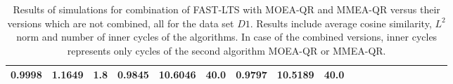 \documentclass[thesis=B,english]{FITthesis}[2012/10/20]
\begin{document}
\begin{table}[h!]
\begin{adjustbox}{angle=90}
{\begin{tabular}{l|l|l|l|r|r|r|r|r|r|r|r|r|r|r|r|r|r|r|}
       0.9998 &  1.1649 &   1.8 &  0.9845 &  10.6046 &  40.0 &  0.9797 &  10.5189 &  40.0 \\
    \hline
    \end{tabular}
    }
			
\end{adjustbox}
    
    \caption{Results of simulations for combination of FAST-LTS with MOEA-QR and MMEA-QR versus their versions which are not combined, all for the data set $D1$. Results include average cosine similarity, $L^2$ norm and number of inner cycles of the algorithms. In case of the combined versions, inner cycles represents only cycles of the second algorithm MOEA-QR or MMEA-QR.}
    \label{table:combined:1}
\end{table}
\end{document}
